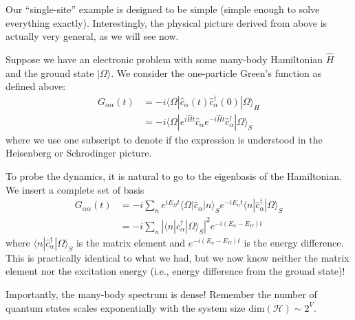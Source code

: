 Our ``single-site'' example is designed to be simple (simple enough to solve everything exactly). Interestingly, the physical picture derived from above is actually very general, as we will see now.

Suppose we have an electronic problem with some many-body Hamiltonian $\hat{H}$ and the ground state $|\Omega\rangle$. We consider the one-particle Green's function as defined above:
\begin{align*}
    G_{\alpha \alpha}\left( t \right) &=-i\langle \Omega |\hat{c}_{\alpha}\left( t \right) \hat{c}_{\alpha}^{\dagger}\left( 0 \right) |\Omega \rangle _H\\
    &=-i\langle \Omega |e^{i\hat{H}t}\hat{c}_{\alpha}e^{-i\hat{H}t}\hat{c}_{\alpha}^{\dagger}|\Omega \rangle _S
\end{align*}
where we use one subscript to denote if the expression is understood in the Heisenberg or Schrodinger picture.

To probe the dynamics, it is natural to go to the eigenbasis of the Hamiltonian. We insert a complete set of basis
\begin{align*}
    G_{\alpha \alpha}\left( t \right) &=-i\sum_n{e^{iE_{\Omega}t}\langle \Omega |\hat{c}_{\alpha}|n\rangle _Se^{-iE_nt}\langle n|\hat{c}_{\alpha}^{\dagger}|\Omega \rangle _S}\\
    &=-i\sum_n{\left| \langle n|\hat{c}_{\alpha}^{\dagger}|\Omega \rangle _S \right|^2e^{-i\left( E_n-E_{\Omega} \right) t}}
\end{align*}
where $\langle n|\hat{c}_{\alpha}^{\dagger}|\Omega \rangle _S$ is the matrix element and $e^{-i\left( E_n-E_{\Omega} \right) t}$ is the energy difference. This is practically identical to what we had, but we now know neither the matrix element nor the excitation energy (i.e., energy difference from the ground state)!

Importantly, the many-body spectrum is dense! Remember the number of quantum states scales exponentially with the system size $\text{dim}(\mathcal{H})\sim 2^V$.
